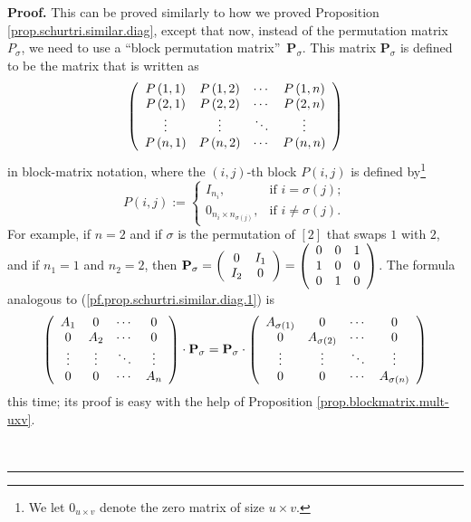 \documentclass[numbers=enddot,12pt,final,onecolumn,notitlepage]{scrartcl}%
\numberwithin{exer}{subsection}
\theoremstyle{definition}
\newenvironment{proof}[1][Proof]{\noindent\textbf{#1.} }{\ \rule{0.5em}{0.5em}}
\begin{document}
\begin{proof}
This can be proved similarly to how we proved Proposition
\ref{prop.schurtri.similar.diag}, except that now, instead of the permutation
matrix $P_{\sigma}$, we need to use a \textquotedblleft block permutation
matrix\textquotedblright\ $\mathbf{P}_{\sigma}$. This matrix $\mathbf{P}%
_{\sigma}$ is defined to be the matrix that is written as%
\[
\left(
\begin{array}
[c]{cccc}%
P\left(  1,1\right)  & P\left(  1,2\right)  & \cdots & P\left(  1,n\right) \\
P\left(  2,1\right)  & P\left(  2,2\right)  & \cdots & P\left(  2,n\right) \\
\vdots & \vdots & \ddots & \vdots\\
P\left(  n,1\right)  & P\left(  n,2\right)  & \cdots & P\left(  n,n\right)
\end{array}
\right)
\]
in block-matrix notation, where the $\left(  i,j\right)  $-th block $P\left(
i,j\right)  $ is defined by\footnote{We let $0_{u\times v}$ denote the zero
matrix of size $u\times v$.}%
\[
P\left(  i,j\right)  :=%
\begin{cases}
I_{n_{i}}, & \text{if }i=\sigma\left(  j\right)  ;\\
0_{n_{i}\times n_{\sigma\left(  j\right)  }}, & \text{if }i\neq\sigma\left(
j\right)  .
\end{cases}
\]
For example, if $n=2$ and if $\sigma$ is the permutation of $\left[  2\right]
$ that swaps $1$ with $2$, and if $n_{1}=1$ and $n_{2}=2$, then $\mathbf{P}%
_{\sigma}=\left(
\begin{array}
[c]{cc}%
0 & I_{1}\\
I_{2} & 0
\end{array}
\right)  =\left(
\begin{array}
[c]{ccc}%
0 & 0 & 1\\
1 & 0 & 0\\
0 & 1 & 0
\end{array}
\right)  $. The formula analogous to (\ref{pf.prop.schurtri.similar.diag.1})
is%
\[
\left(
\begin{array}
[c]{cccc}%
A_{1} & 0 & \cdots & 0\\
0 & A_{2} & \cdots & 0\\
\vdots & \vdots & \ddots & \vdots\\
0 & 0 & \cdots & A_{n}%
\end{array}
\right)  \cdot\mathbf{P}_{\sigma}=\mathbf{P}_{\sigma}\cdot\left(
\begin{array}
[c]{cccc}%
A_{\sigma\left(  1\right)  } & 0 & \cdots & 0\\
0 & A_{\sigma\left(  2\right)  } & \cdots & 0\\
\vdots & \vdots & \ddots & \vdots\\
0 & 0 & \cdots & A_{\sigma\left(  n\right)  }%
\end{array}
\right)
\]
this time; its proof is easy with the help of Proposition
\ref{prop.blockmatrix.mult-uxv}.


\end{proof}
\end{document}
